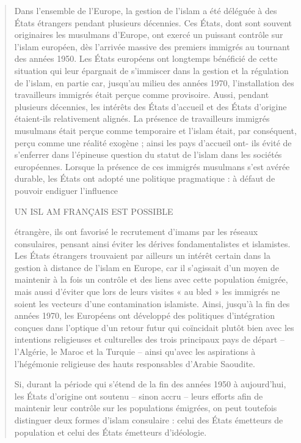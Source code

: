\begin{quote}
Dans l'ensemble de l'Europe, la gestion de l'islam a été déléguée à des
États étrangers pendant plusieurs décennies. Ces États, dont sont
souvent originaires les musulmans d'Europe, ont exercé un puissant
contrôle sur l'islam européen, dès l'arrivée massive des premiers
immigrés au tournant des années 1950. Les États européens ont longtemps
bénéficié de cette situation qui leur épargnait de s'immiscer dans la
gestion et la régulation de l'islam, en partie car, jusqu'au milieu des
années 1970, l'installation des travailleurs immigrés était perçue comme
provisoire. Aussi, pendant plusieurs décennies, les intérêts des États
d'accueil et des États d'origine étaient-ils relativement alignés. La
présence de travailleurs immigrés musulmans était perçue comme
temporaire et l'islam était, par conséquent, perçu comme une réalité
exogène ; ainsi les pays d'accueil ont- ils évité de s'enferrer dans
l'épineuse question du statut de l'islam dans les sociétés européennes.
Lorsque la présence de ces immigrés musulmans s'est avérée durable, les
États ont adopté une politique pragmatique : à défaut de pouvoir
endiguer l'influence

UN ISL AM FRANÇAIS EST POSSIBLE

étrangère, ils ont favorisé le recrutement d'imams par les réseaux
consulaires, pensant ainsi éviter les dérives fondamentalistes et
islamistes. Les États étrangers trouvaient par ailleurs un intérêt
certain dans la gestion à distance de l'islam en Europe, car il
s'agissait d'un moyen de maintenir à la fois un contrôle et des liens
avec cette population émigrée, mais aussi d'éviter que lors de leurs
visites « au bled » les immigrés ne soient les vecteurs d'une
contamination islamiste. Ainsi, jusqu'à la fin des années 1970, les
Européens ont développé des politiques d'intégration conçues dans
l'optique d'un retour futur qui coïncidait plutôt bien avec les
intentions religieuses et culturelles des trois principaux pays de
départ -- l'Algérie, le Maroc et la Turquie -- ainsi qu'avec les
aspirations à l'hégémonie religieuse des hauts responsables d'Arabie
Saoudite.

Si, durant la période qui s'étend de la fin des années 1950 à
aujourd'hui, les États d'origine ont soutenu -- sinon accru -- leurs
efforts afin de maintenir leur contrôle sur les populations émigrées, on
peut toutefois distinguer deux formes d'islam consulaire : celui des
États émetteurs de population et celui des États émetteurs d'idéologie.
\end{quote}

